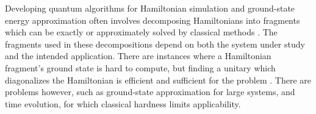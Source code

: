 \documentclass[%
 aip,
 amsmath,amssymb,
 reprint,%
]{revtex4-1}
\begin{document}
\indent Developing quantum algorithms for Hamiltonian simulation and ground-state energy approximation often involves decomposing Hamiltonians into fragments which can be exactly or approximately solved by classical methods \cite{kitaev2002classical, Aaronson_2004, gottesmanknill}. The fragments used in these decompositions depend on both the system under study and the intended application. 
There are instances where a Hamiltonian fragment's ground state is hard to compute, but finding a unitary which diagonalizes the Hamiltonian is efficient and sufficient for the problem \cite{patel2023extensionexactlysolvablehamiltoniansusing}. There are problems however, such as ground-state approximation for large systems, and time evolution, for which classical hardness limits applicability.
\end{document}
